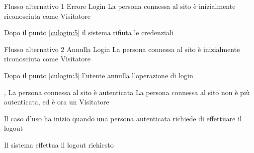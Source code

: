 %
{Flusso alternativo 1}%
{Errore Login}%
{La persona connessa al sito è inizialmente riconosciuta come Visitatore}%
{\postNulle}%
{\begin{enumCU}
	\item Dopo il punto \ref{culogin:5} il sistema rifiuta le credenziali
\end{enumCU}}%
%
{Flusso alternativo 2}%
{Annulla Login}%
{La persona connessa al sito è inizialmente riconosciuta come Visitatore}%
{\postNulle}%
{\begin{enumCU}
		\item Dopo il punto \ref{culogin:3} l'utente annulla l'operazione di login
	\end{enumCU}}%

\tabcuvspace

{, }
{La persona connessa al sito è autenticata}
{La persona connessa al sito non è più autenticata, ed è ora un Visitatore}
{\begin{enumCU}
	\item Il caso d'uso ha inizio quando una persona autenticata richiede di effettuare il logout
	\item Il sistema effettua il logout richiesto
\end{enumCU}}

